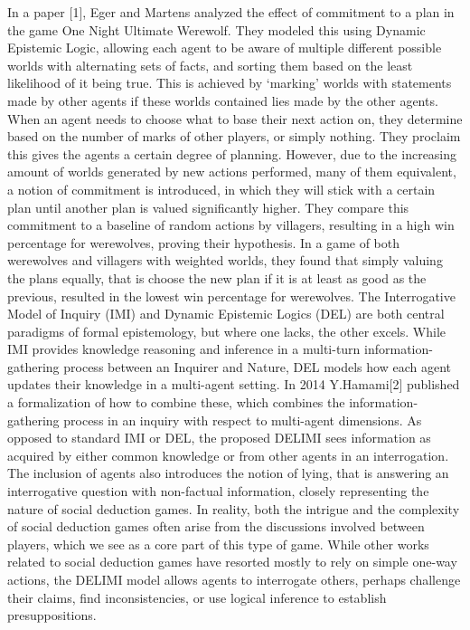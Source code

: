 In a paper [1], Eger and Martens analyzed the effect of commitment to a plan in
the game One Night Ultimate Werewolf. They modeled this using Dynamic Epistemic
Logic, allowing each agent to be aware of multiple different possible worlds
with alternating sets of facts, and sorting them based on the least likelihood
of it being true. This is achieved by ‘marking’ worlds with statements made by
other agents if these worlds contained lies made by the other agents. When an
agent needs to choose what to base their next action on, they determine based
on the number of marks of other players, or simply nothing. They proclaim this
gives the agents a certain degree of planning. However, due to the increasing
amount of worlds generated by new actions performed, many of them equivalent, a
notion of commitment is introduced, in which they will stick with a certain
plan until another plan is valued significantly higher. They compare this
commitment to a baseline of random actions by villagers, resulting in a high
win percentage for werewolves, proving their hypothesis. In a game of both
werewolves and villagers with weighted worlds, they found that simply valuing
the plans equally, that is choose the new plan if it is at least as good as the
previous, resulted in the lowest win percentage for werewolves. The
Interrogative Model of Inquiry (IMI) and Dynamic Epistemic Logics (DEL) are
both central paradigms of formal epistemology, but where one lacks, the other
excels. While IMI provides knowledge reasoning and inference in a multi-turn
information-gathering process between an Inquirer and Nature, DEL models how
each agent updates their knowledge in a multi-agent setting. In 2014
Y.Hamami[2] published a formalization of how to combine these, which combines
the information-gathering process in an inquiry with respect to multi-agent
dimensions. As opposed to standard IMI or DEL, the proposed DELIMI sees
information as acquired by either common knowledge or from other agents in an
interrogation. The inclusion of agents also introduces the notion of lying,
that is answering an interrogative question with non-factual information,
closely representing the nature of social deduction games. In reality, both the
intrigue and the complexity of social deduction games often arise from the
discussions involved between players, which we see as a core part of this type
of game. While other works related to social deduction games have resorted
mostly to rely on simple one-way actions, the DELIMI model allows agents to
interrogate others, perhaps challenge their claims, find inconsistencies, or
use logical inference to establish presuppositions.

